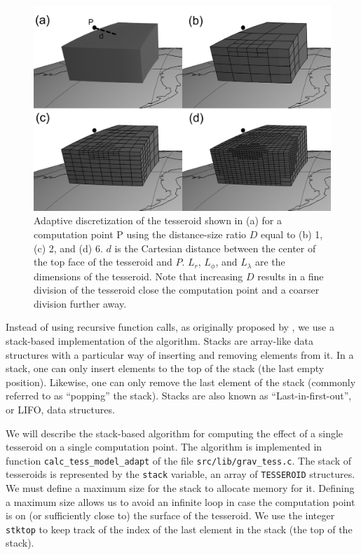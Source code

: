 \documentclass[paper,twocolumn]{geophysics}
\begin{document}
\begin{figure}
    \centering
    \includegraphics{figs/tesseroid-split}
    \caption{
        Adaptive discretization
        of the tesseroid shown in (a)
        for a computation point P
        using the distance-size ratio $D$ equal to
        (b) 1, (c) 2, and (d) 6.
        $d$ is the Cartesian distance between
        the center of the top face of the tesseroid
        and $P$.
        $L_r$, $L_\phi$, and $L_\lambda$ are the dimensions of the tesseroid.
        Note that increasing $D$
        results in a fine division of the tesseroid
        close the computation point
        and a coarser division further away.
    }
    \label{fig:division}
\end{figure}

Instead of using recursive function calls,
as originally proposed by \citet{Li2011},
we use a stack-based implementation of the algorithm.
Stacks are array-like data structures
with a particular way of inserting and removing elements from it.
In a stack,
one can only insert elements to the top of the stack
(the last empty position).
Likewise,
one can only remove the last element of the stack
(commonly referred to as ``popping'' the stack).
Stacks are also known as ``Last-in-first-out'', or LIFO, data structures.

We will describe the stack-based algorithm
for computing the effect of a single tesseroid
on a single computation point.
The algorithm is implemented in function \texttt{calc\_tess\_model\_adapt}
of the file \texttt{src/lib/grav\_tess.c}.
The stack of tesseroids is represented by
the \texttt{stack} variable,
an array of \texttt{TESSEROID} structures.
We must define a maximum size for the stack to allocate memory for it.
Defining a maximum size allows us to
avoid an infinite loop
in case the computation point is on
(or sufficiently close to) the surface of the tesseroid.
We use the integer \texttt{stktop}
to keep track of the index of
the last element in the stack (the top of the stack).
\end{document}
